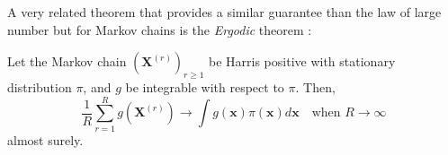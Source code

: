 \documentclass[12pt]{memoir}
\newcommand{\mb}{\mathbf}
\newcommand{\ti}{\textit}
\begin{document}
A very related theorem that provides a similar guarantee than the law of large number but for Markov chains is the \ti{Ergodic} theorem \cite{mcmc:slides:Rigon2024Mar}:

\begin{boxedthm}
    Let the Markov chain $(\mb X^{(r)})_{r\geq 1}$ be Harris positive with stationary distribution $\pi$, and $g$ be integrable with respect to $\pi$. Then,
    \begin{equation}
        \frac{1}{R}\sum_{r=1}^{R}g(\mb X^{(r)}) \rightarrow \int g(\mb x) \pi(\mb x) d \mb x \quad \text{when } R \rightarrow \infty
    \end{equation} 
    almost surely.
\end{boxedthm}

\end{document}
